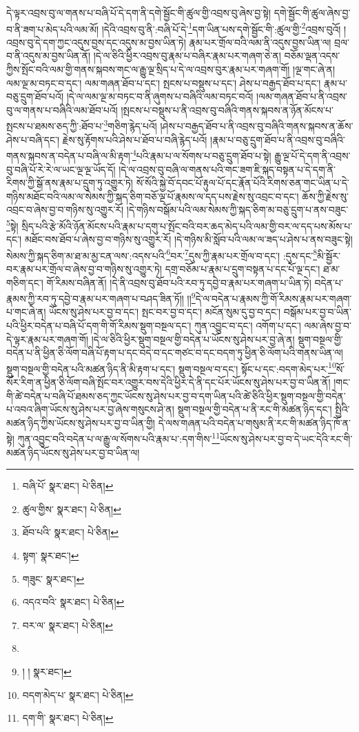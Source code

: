 དེ་ལྟར་འབྲས་བུ་ལ་གནས་པ་བཞི་པོ་དེ་དག་ནི་དགེ་སྦྱོང་གི་ཚུལ་གྱི་འབྲས་བུ་ཞེས་བྱ་སྟེ། དགེ་སྦྱོང་གི་ཚུལ་ཞེས་བྱ་བ་ནི་ཟག་པ་མེད་པའི་ལམ་མོ། །དེའི་འབྲས་བུ་ནི་:བཞི་པོ་དེ་\footnote{བཞི་པོ་  སྣར་ཐང་།  པེ་ཅིན། }དག་ཡིན་པས་དགེ་སྦྱོང་གི་:ཚུལ་གྱི་\footnote{ཚུལ་གྱིས་  སྣར་ཐང་།  པེ་ཅིན། }འབྲས་བུའོ། །འབྲས་བུ་དེ་དག་ཀྱང་འདུས་བྱས་དང་འདུས་མ་བྱས་ཡིན་ཏེ། རྣམ་པར་གྲོལ་བའི་ལམ་ནི་འདུས་བྱས་ཡིན་ལ། བྲལ་བ་ནི་འདུས་མ་བྱས་ཡིན་ནོ། །དེ་ལ་ཅིའི་ཕྱིར་འབྲས་བུ་རྣམ་པ་བཞིར་རྣམ་པར་གཞག་ཅེ་ན། བཅོམ་ལྡན་འདས་ཀྱིས་སྤོང་བའི་ལམ་གྱི་གནས་སྐབས་གང་ལ་རྒྱུ་ལྔ་སྲིད་པ་དེ་ལ་འབྲས་བུར་རྣམ་པར་གཞག་གོ། །ལྔ་གང་ཞེ་ན། ལམ་ལྔ་མ་བཏང་བ་དང་། ལམ་གཞན་ཐོབ་པ་དང་། སྤངས་པ་བསྡུས་པ་དང་། ཤེས་པ་བརྒྱད་ཐོབ་པ་དང་། རྣམ་པ་བཅུ་དྲུག་ཐོབ་པའོ། །དེ་ལ་ལམ་ལྔ་མ་བཏང་བ་ནི་ཞུགས་པ་བཞིའི་ལམ་བཏང་བའོ། །ལམ་གཞན་ཐོབ་པ་ནི་འབྲས་བུ་ལ་གནས་པ་བཞིའི་ལམ་ཐོབ་པའོ། །སྤངས་པ་བསྡུས་པ་ནི་འབྲས་བུ་བཞིའི་གནས་སྐབས་ན་ཉོན་མོངས་པ་སྤངས་པ་ཐམས་ཅད་ཀྱི་:ཐོབ་པ་\footnote{ཐོབ་པའི་  སྣར་ཐང་།  པེ་ཅིན། }གཅིག་རྙེད་པའོ། །ཤེས་པ་བརྒྱད་ཐོབ་པ་ནི་འབྲས་བུ་བཞིའི་གནས་སྐབས་ན་ཆོས་ཤེས་པ་བཞི་དང་། རྗེས་སུ་རྟོགས་པའི་ཤེས་པ་ཐོབ་པ་བཞི་རྙེད་པའོ། །རྣམ་པ་བཅུ་དྲུག་ཐོབ་པ་ནི་འབྲས་བུ་བཞིའི་གནས་སྐབས་ན་བདེན་པ་བཞི་ལ་མི་རྟག་\footnote{སྟག་  སྣར་ཐང་། }པའི་རྣམ་པ་ལ་སོགས་པ་བཅུ་དྲུག་ཐོབ་པ་སྟེ། རྒྱུ་ལྔ་པོ་དེ་དག་ནི་འབྲས་བུ་བཞི་པོ་རེ་རེ་ལ་ཡང་ལྔ་ལྔ་ཡོད་དོ། །དེ་ལ་འབྲས་བུ་བཞི་ལ་གནས་པའི་གང་ཟག་ཇི་སྐད་བསྟན་པ་དེ་དག་ནི་རིགས་ཀྱི་སྒོ་ནས་རྣམ་པ་དྲུག་ཏུ་འགྱུར་ཏེ། སོ་སོའི་སྐྱེ་བོ་དབང་པོ་རྟུལ་པོ་དང་རྣོན་པོའི་རིགས་ཅན་གང་ཡིན་པ་དེ་གཉིས་མཐོང་བའི་ལམ་ལ་སེམས་ཀྱི་སྐད་ཅིག་བཅོ་ལྔ་པོ་རྣམས་ལ་དད་པས་རྗེས་སུ་འབྲང་བ་དང་། ཆོས་ཀྱི་རྗེས་སུ་འབྲང་བ་ཞེས་བྱ་བ་གཉིས་སུ་འགྱུར་རོ། །དེ་གཉིས་བསྒོམ་པའི་ལམ་སེམས་ཀྱི་སྐད་ཅིག་མ་བཅུ་དྲུག་པ་ནས་བཟུང་\footnote{གཟུང་  སྣར་ཐང་། }སྟེ། སྲིད་པའི་རྩེ་མོའི་ཉོན་མོངས་པའི་རྣམ་པ་དགུ་པ་སྤོང་བའི་བར་ཆད་མེད་པའི་ལམ་གྱི་བར་ལ་དད་པས་མོས་པ་དང་། མཐོང་བས་ཐོབ་པ་ཞེས་བྱ་བ་གཉིས་སུ་འགྱུར་རོ། །དེ་གཉིས་མི་སློབ་པའི་ལམ་ལ་ཟད་པ་ཤེས་པ་ནས་བཟུང་སྟེ། སེམས་ཀྱི་སྐད་ཅིག་མ་ཐ་མ་མྱ་ངན་ལས་:འདས་པའི་\footnote{འདའ་བའི་  སྣར་ཐང་།  པེ་ཅིན། }བར་\footnote{བར་ལ་  སྣར་ཐང་།  པེ་ཅིན། }དུས་ཀྱི་རྣམ་པར་གྲོལ་བ་དང་། :དུས་དང་\footnote{}མི་སྦྱོར་བར་རྣམ་པར་གྲོལ་བ་ཞེས་བྱ་བ་གཉིས་སུ་འགྱུར་ཏེ། དགྲ་བཅོམ་པ་རྣམ་པ་དྲུག་བསྟན་པ་དང་པོ་ལྔ་དང་། ཐ་མ་གཅིག་དང་། གོ་རིམས་བཞིན་ནོ། །དེ་ནི་འབྲས་བུ་ཐོབ་པའི་རབ་ཏུ་དབྱེ་བ་རྣམ་པར་གཞག་པ་ཡིན་ཏེ། བདེན་པ་རྣམས་ཀྱི་རབ་ཏུ་དབྱེ་བ་རྣམ་པར་གཞག་པ་བཤད་ཟིན་ཏོ།། །།\footnote{། །  སྣར་ཐང་། }དེ་ལ་བདེན་པ་རྣམས་ཀྱི་གོ་རིམས་རྣམ་པར་གཞག་པ་གང་ཞེ་ན། ཡོངས་སུ་ཤེས་པར་བྱ་བ་དང་། སྤང་བར་བྱ་བ་དང་། མངོན་སུམ་དུ་བྱ་བ་དང་། བསྒོམ་པར་བྱ་བ་ཡིན་པའི་ཕྱིར་བདེན་པ་བཞི་པོ་དག་གི་གོ་རིམས་སྡུག་བསྔལ་དང་། ཀུན་འབྱུང་བ་དང་། འགོག་པ་དང་། ལམ་ཞེས་བྱ་བ་དེ་ལྟར་རྣམ་པར་གཞག་གོ། །དེ་ལ་ཅིའི་ཕྱིར་སྡུག་བསྔལ་གྱི་བདེན་པ་ཡོངས་སུ་ཤེས་པར་བྱ་ཞེ་ན། སྡུག་བསྔལ་གྱི་བདེན་པ་ནི་ཕྱིན་ཅི་ལོག་བཞི་པོ་རྟག་པ་དང་བདེ་བ་དང་གཙང་བ་དང་བདག་ཏུ་ཕྱིན་ཅི་ལོག་པའི་གནས་ཡིན་ལ། སྡུག་བསྔལ་གྱི་བདེན་པའི་མཚན་ཉིད་ནི་མི་རྟག་པ་དང་། སྡུག་བསྔལ་བ་དང་། སྟོང་པ་དང་:བདག་མེད་པར་\footnote{བདག་མེད་པ་  སྣར་ཐང་།  པེ་ཅིན། }སོ་སོར་རིག་ན་ཕྱིན་ཅི་ལོག་བཞི་སྤོང་བར་འགྱུར་བས་དེའི་ཕྱིར་དེ་ནི་དང་པོར་ཡོངས་སུ་ཤེས་པར་བྱ་བ་ཡིན་ནོ། །གང་གི་ཚེ་བདེན་པ་བཞི་པོ་ཐམས་ཅད་ཀྱང་ཡོངས་སུ་ཤེས་པར་བྱ་བ་དག་ཡིན་པའི་ཚེ་ཅིའི་ཕྱིར་སྡུག་བསྔལ་གྱི་བདེན་པ་འབའ་ཞིག་ཡོངས་སུ་ཤེས་པར་བྱ་ཞེས་གསུངས་ཤེ་ན། སྡུག་བསྔལ་གྱི་བདེན་པ་ནི་རང་གི་མཚན་ཉིད་དང་། སྤྱིའི་མཚན་ཉིད་ཀྱིས་ཡོངས་སུ་ཤེས་པར་བྱ་བ་ཡིན་གྱི། དེ་ལས་གཞན་པའི་བདེན་པ་གསུམ་ནི་རང་གི་མཚན་ཉིད་ཁོ་ན་སྟེ། ཀུན་འབྱུང་བའི་བདེན་པ་ལ་རྒྱུ་ལ་སོགས་པའི་རྣམ་པ་:དག་གིས་\footnote{དག་གི་  སྣར་ཐང་།  པེ་ཅིན། }ཡོངས་སུ་ཤེས་པར་བྱ་བ་དེ་ཡང་དེའི་རང་གི་མཚན་ཉིད་ཡོངས་སུ་ཤེས་པར་བྱ་བ་ཡིན་ལ། 